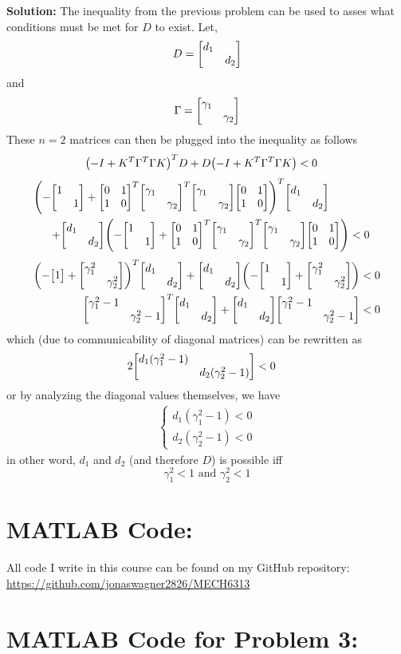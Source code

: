 \documentclass[letter]{article}
\begin{document}
\noindent
\textbf{Solution:}
The inequality from the previous problem can be used to asses what conditions must be met for $D$ to exist.
Let, $$D = \mqty[\dmat{d_1}{d_2}]$$ and $$\Gamma = \mqty[\dmat{\gamma_1}{\gamma_2}]$$
These $n=2$ matrices can then be plugged into the inequality as follows
\begin{align}
	\qty(- I + K^T \Gamma^T \Gamma K)^T D + D\qty(- I + K^T \Gamma^T \Gamma K) &< 0
\end{align}
\begin{align}
	\qty(- \mqty[\dmat{1}{1}] + \mqty[0&1\\1&0]^T \mqty[\dmat{\gamma_1}{\gamma_2}]^T \mqty[\dmat{\gamma_1}{\gamma_2}] \mqty[0&1\\1&0])^T \mqty[\dmat{d_1}{d_2}]\hspace{0.25in}\nonumber\\ + \mqty[\dmat{d_1}{d_2}]\qty(- \mqty[\dmat{1}{1}] + \mqty[0&1\\1&0]^T \mqty[\dmat{\gamma_1}{\gamma_2}]^T \mqty[\dmat{\gamma_1}{\gamma_2}] \mqty[0&1\\1&0]) &< 0
\end{align}
\begin{align}
	\qty(-\mqty[\dmat{1}] + \mqty[\dmat{\gamma_1^2}{\gamma_2^2}])^T\mqty[\dmat{d_1}{d_2}] + \mqty[\dmat{d_1}{d_2}]\qty(-\mqty[\dmat{1}{1}] + \mqty[\dmat{\gamma_1^2}{\gamma_2^2}]) &<0\\
	\mqty[\dmat{\gamma_1^2-1}{\gamma_2^2-1}]^T \mqty[\dmat{d_1}{d_2}] + \mqty[\dmat{d_1}{d_2}] \mqty[\dmat{\gamma_1^2-1}{\gamma_2^2-1}] &<0
\end{align}
which (due to communicability of diagonal matrices) can be rewritten as
\begin{align}
	2 \mqty[\dmat{d_1(\gamma_1^2-1)}{d_2(\gamma_2^2-1)}] &< 0
\end{align}
or by analyzing the diagonal values themselves, we have
\begin{align}
	\begin{cases}
		d_1(\gamma_1^2 - 1) < 0\\
		d_2(\gamma_2^2 - 1) < 0
	\end{cases}
\end{align}
in other word, $d_1$ and $d_2$ (and therefore $D$) is possible iff $$\gamma_1^2 < 1 \text{ and } \gamma_2^2 < 1$$

\newpage
\appendix
\section{MATLAB Code:}\label{apx:matlab}
All code I write in this course can be found on my GitHub repository:\\
\href{https://github.com/jonaswagner2826/MECH6313}{https://github.com/jonaswagner2826/MECH6313}


\newpage
\section{MATLAB Code for Problem 3:}\label{apx:matlabpblm3}

\end{document}
